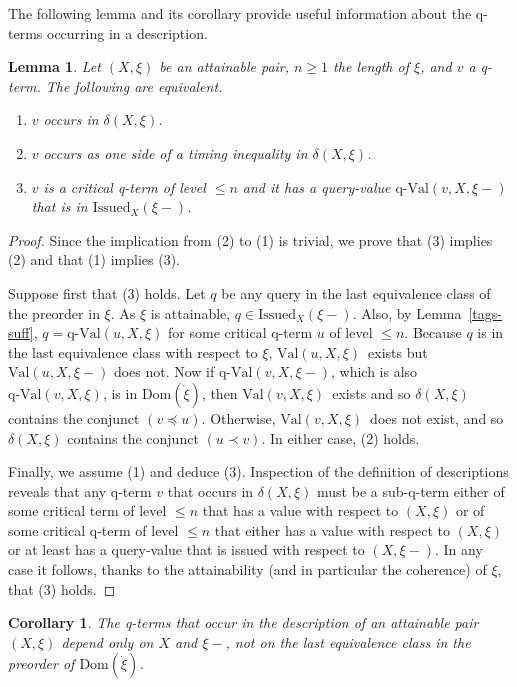 \documentclass{LMCS}
\newtheorem{la}[thm]{Lemma}
\newtheorem{coro}[thm]{Corollary}
\theoremstyle{definition}
\newenvironment{lsnum}{\begin{enumerate}}{\end{enumerate}}
\newcommand{\Issued}{\text{Issued}}
\newcommand{\ans}{\dot}
\newcommand{\dom}[1]{\ensuremath{{\text{Dom}}(#1)}}
\newcommand{\qval}[3]{\ensuremath{\text{q-Val}(#1,#2,#3)}}
\newcommand{\val}[3]{\ensuremath{\text{Val}(#1,#2,#3)}}
\begin{document}
The following lemma and its corollary provide useful information about
the q-terms occurring in a description.

\begin{la}
Let $(X,\xi)$ be an attainable pair, $n\geq1$ the length of $\xi$, and
$v$ a q-term.  The following are equivalent.
\begin{lsnum}
\item $v$ occurs in $\delta(X,\xi)$.
\item $v$ occurs as one side of a timing inequality in
  $\delta(X,\xi)$.
\item $v$ is a critical q-term of level $\leq n$ and it has a
  query-value $\qval vX{\xi-}$ that is in $\Issued_X(\xi-)$.
\end{lsnum}
\end{la}

\begin{proof}
Since the implication from (2) to (1) is trivial, we prove that (3)
implies (2) and that (1) implies (3).

Suppose first that (3) holds.  Let $q$ be any query in the last
equivalence class of the preorder in $\xi$.  As $\xi$ is attainable,
$q\in\Issued_X(\xi-)$.  Also, by Lemma~\ref{tags-suff}, $q=\qval
uX\xi$ for some critical q-term $u$
of level $\leq n$.  Because $q$ is in the
last equivalence class with respect to $\xi$, \val uX\xi\ exists but
\val uX{\xi-} does not.  Now if $\qval vX{\xi-}$, which is also $\qval
vX\xi$, is in \dom{\ans\xi}, then \val vX\xi\ exists and so
$\delta(X,\xi)$ contains the conjunct $(v\preceq u)$.  Otherwise, \val
vX\xi\ does not exist, and so $\delta(X,\xi)$ contains the conjunct
$(u\prec v)$.  In either case, (2) holds.

Finally, we assume (1) and deduce (3).  Inspection of the definition
of descriptions reveals that any q-term $v$ that occurs in
$\delta(X,\xi)$ must be a sub-q-term either of some critical term of
level $\leq n$ that has a value with respect to $(X,\xi)$ or of some
critical q-term of level $\leq n$ that either has a value with respect
to $(X,\xi)$ or at least has a query-value that is issued with respect
to $(X,\xi-)$.  In any case it follows, thanks to the attainability
(and in particular the coherence) of $\xi$, that (3) holds.
\end{proof}

\begin{coro}
  The q-terms that occur in the description of an attainable pair
  $(X,\xi)$ depend only on $X$ and $\xi-$, not on the last equivalence
  class in the preorder of \dom{\ans\xi}.
\end{coro}
\end{document}
